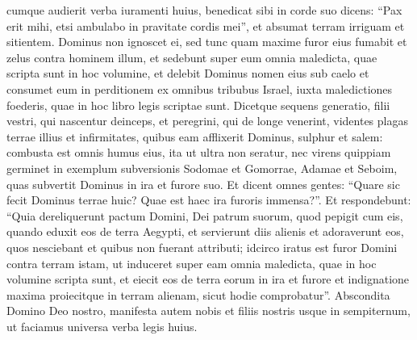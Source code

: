 \begin{biblechapter}
\begin{biblechapter}
\begin{biblechapter}
\begin{biblechapter}
\begin{biblechapter}
\begin{biblechapter}
\begin{biblechapter}
\begin{biblechapter}
\begin{biblechapter}
\begin{biblechapter}
\begin{biblechapter}
\begin{biblechapter}
\begin{biblechapter}
\begin{biblechapter}
\begin{biblechapter}
\begin{biblechapter}
\begin{biblechapter}
\begin{biblechapter}
\begin{biblechapter}
\begin{biblechapter}
\begin{biblechapter}
\begin{biblechapter}
\begin{biblechapter}
\begin{biblechapter}
\begin{biblechapter}
\begin{biblechapter}
\begin{biblechapter}
\begin{biblechapter}
\begin{biblechapter}
\verse cumque audierit verba iuramenti huius, benedicat sibi in corde suo dicens: “Pax erit mihi, etsi ambulabo in pravitate cordis mei”, et absumat terram irriguam et sitientem. 
\verse Dominus non ignoscet ei, sed tunc quam maxime furor eius fumabit et zelus contra hominem illum, et sedebunt super eum omnia maledicta, quae scripta sunt in hoc volumine, et delebit Dominus nomen eius sub caelo 
 \verse et consumet eum in perditionem ex omnibus tribubus Israel, iuxta maledictiones foederis, quae in hoc libro legis scriptae sunt.
 \verse Dicetque sequens generatio, filii vestri, qui nascentur deinceps, et peregrini, qui de longe venerint, videntes plagas terrae illius et infirmitates, quibus eam afflixerit Dominus, 
\verse sulphur et salem: combusta est omnis humus eius, ita ut ultra non seratur, nec virens quippiam germinet in exemplum subversionis Sodomae et Gomorrae, Adamae et Seboim, quas subvertit Dominus in ira et furore suo. 
\verse Et dicent omnes gentes: “Quare sic fecit Dominus terrae huic? Quae est haec ira furoris immensa?”. 
\verse Et respondebunt: “Quia dereliquerunt pactum Domini, Dei patrum suorum, quod pepigit cum eis, quando eduxit eos de terra Aegypti, 
\verse et servierunt diis alienis et adoraverunt eos, quos nesciebant et quibus non fuerant attributi; 
\verse idcirco iratus est furor Domini contra terram istam, ut induceret super eam omnia maledicta, quae in hoc volumine scripta sunt, 
\verse et eiecit eos de terra eorum in ira et furore et indignatione maxima proiecitque in terram alienam, sicut hodie comprobatur”.
 \verse Abscondita Domino Deo nostro, manifesta autem nobis et filiis nostris usque in sempiternum, ut faciamus universa verba legis huius.
 

\end{biblechapter}
\end{biblechapter}
\end{biblechapter}
\end{biblechapter}
\end{biblechapter}
\end{biblechapter}
\end{biblechapter}
\end{biblechapter}
\end{biblechapter}
\end{biblechapter}
\end{biblechapter}
\end{biblechapter}
\end{biblechapter}
\end{biblechapter}
\end{biblechapter}
\end{biblechapter}
\end{biblechapter}
\end{biblechapter}
\end{biblechapter}
\end{biblechapter}
\end{biblechapter}
\end{biblechapter}
\end{biblechapter}
\end{biblechapter}
\end{biblechapter}
\end{biblechapter}
\end{biblechapter}
\end{biblechapter}
\end{biblechapter}
